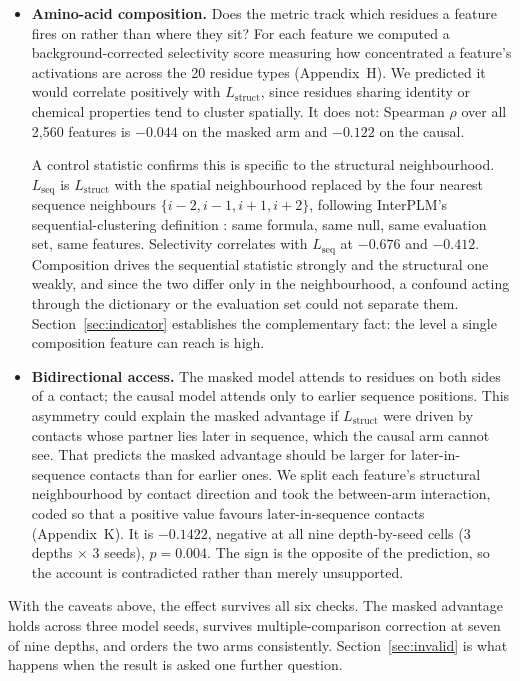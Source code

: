 \documentclass{article} %
\newcommand{\red}[1]{\textcolor{red}{#1}}
\newcommand{\opentag}[1]{\textcolor{red}{\textsuperscript{[\ref{#1}]}}}
\newcommand{\pend}[2]{\red{#1}\opentag{#2}}
\renewcommand{\red}[1]{#1}
\renewcommand{\opentag}[1]{}
\renewcommand{\pend}[2]{#1}
\newcommand{\Lstruct}{\ensuremath{L_{\mathrm{struct}}}}
\newcommand{\Lseq}{\ensuremath{L_{\mathrm{seq}}}}
\begin{document}
\begin{itemize}[leftmargin=1.2em]
\item \textbf{Amino-acid composition.} Does the metric track which residues a feature fires on
rather than where they sit? For each feature we computed a background-corrected selectivity score
measuring how concentrated a feature's activations are across the 20 residue types
(Appendix~H). \pend{We predicted it would correlate positively with \Lstruct, since residues
sharing identity or chemical properties tend to cluster spatially. It does not: Spearman $\rho$
over all 2{,}560 features is $-0.044$ on the masked arm and $-0.122$ on the causal.}{t:top1share}

A control statistic confirms this is specific to the structural neighbourhood. \Lseq{} is
\Lstruct{} with the spatial neighbourhood replaced by the four nearest sequence neighbours $\{i-2,
i-1, i+1, i+2\}$, following InterPLM's sequential-clustering definition
\citep{simon2025interplm}: same formula, same null, same evaluation set, same features.
Selectivity correlates with \Lseq{} at $-0.676$ and $-0.412$. Composition drives the sequential
statistic strongly and the structural one weakly, and since the two differ only in the
neighbourhood, a confound acting through the dictionary or the evaluation set could not separate
them. Section~\ref{sec:indicator} establishes the complementary fact: the level a single
composition feature can reach is high.

\item \textbf{Bidirectional access.} The masked model attends to residues on both sides of a
contact; the causal model attends only to earlier sequence positions. This asymmetry could explain
the masked advantage if \Lstruct{} were driven by contacts whose partner lies later in sequence,
which the causal arm cannot see. That predicts the masked advantage should be larger for
later-in-sequence contacts than for earlier ones. We split each feature's structural neighbourhood
by contact direction and took the between-arm interaction, coded so that a positive value favours
later-in-sequence contacts (Appendix~K). It is $-0.1422$, negative at all nine depth-by-seed cells
(3 depths $\times$ 3 seeds), $p = 0.004$. The sign is the opposite of the prediction, so the
account is contradicted rather than merely unsupported.

\end{itemize}

With the caveats above, the effect survives all six checks. The masked advantage holds across
three model seeds, survives multiple-comparison correction at seven of nine depths, and orders the
two arms consistently. Section~\ref{sec:invalid} is what happens when the result is asked one
further question.
\end{document}
